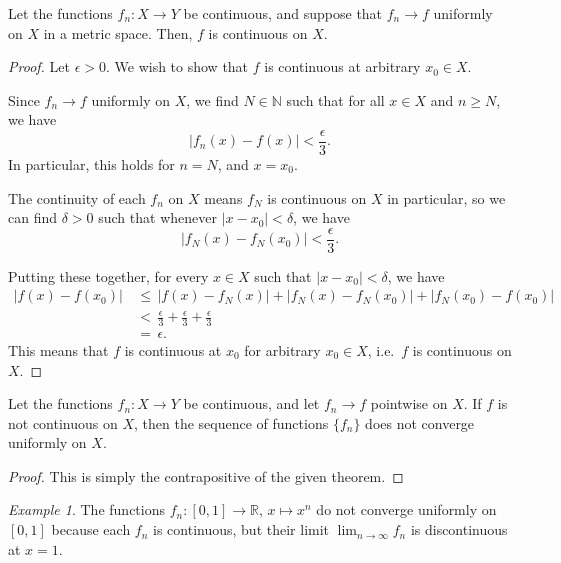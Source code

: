 \documentclass[11pt]{article}
\def\R{\mathbb{R}}
\def\N{\mathbb{N}}
\theoremstyle{definition}
\theoremstyle{remark}
\newtheorem*{example}{Example}
\numberwithin{equation}{module}
\begin{document}
    \begin{theorem} \label{th:continuous}
        Let the functions $f_n\colon X \to Y$ be continuous, and suppose that 
        $f_n \to f$ uniformly on $X$ in a metric space. Then, $f$ is continuous on
        $X$.
    \end{theorem}
    \begin{proof}
        Let $\epsilon > 0$. We wish to show that $f$ is continuous at 
        arbitrary $x_0 \in X$.
        
        Since $f_n \to f$ uniformly on $X$, we find $N \in \N$ such that for all $x
        \in X$ and $n \geq N$, we have \[
            |f_n(x) - f(x)| < \frac{\epsilon}{3}.
        \] In particular, this holds for $n = N$, and $x = x_0$.
        
        The continuity of each $f_n$ on $X$ means $f_N$ is
        continuous on $X$ in particular, so we can find $\delta > 0$ such that 
        whenever $|x - x_0| < \delta$, we have \[
            |f_N(x) - f_N(x_0)| < \frac{\epsilon}{3}.
        \]

        Putting these together, for every $x \in X$ such that $|x - x_0| < \delta$,
        we have
        \begin{align*}
            |f(x) - f(x_0)| 
                \,&\leq\, |f(x) - f_N(x)| + |f_N(x) - f_N(x_0)| + 
                    |f_N(x_0) - f(x_0)| \\
                \,&<\, \frac{\epsilon}{3} + \frac{\epsilon}{3} +
                    \frac{\epsilon}{3} \\
                \,&=\, \epsilon.
        \end{align*}
        This means that $f$ is continuous at $x_0$ for arbitrary $x_0 \in X$, i.e.\
        $f$ is continuous on $X$.
    \end{proof}
    \begin{corollary}
        Let the functions $f_n\colon X \to Y$ be continuous, and let $f_n \to f$
        pointwise on $X$. If $f$ is not continuous on $X$, then the
        sequence of functions $\{f_n\}$ does not converge uniformly on $X$.
    \end{corollary}
    \begin{proof}
        This is simply the contrapositive of the given theorem.
    \end{proof}
    \begin{example}
        The functions $f_n\colon [0, 1] \to \R$, $x \mapsto x^n$ do not converge
        uniformly on $[0, 1]$ because each $f_n$ is continuous, but their limit 
        $\lim_{n \to \infty} f_n$ is discontinuous at $x = 1$.
    \end{example}
\end{document}
